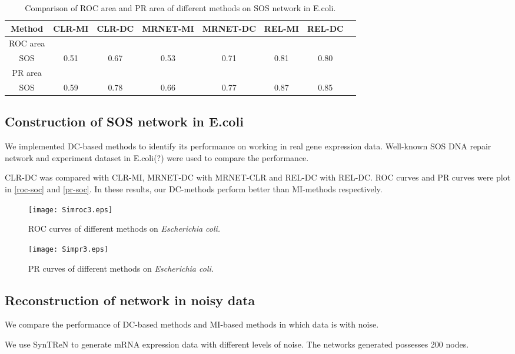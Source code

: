 \documentclass{bioinfo}
\begin{document}
\begin{table}[0.5\textwidth] \tiny
\centering \caption{Comparison of ROC area and PR area of different methods on SOS network in E.coli.}\label{roc-pr}
\begin{tabular}{cccccccc}
 \hline
 Method & CLR-MI & CLR-DC & MRNET-MI & MRNET-DC & REL-MI & REL-DC \\
 \hline
  ROC area\\
  SOS     & 0.51 & 0.67 & 0.53 & 0.71 & 0.81 & 0.80 \\
 PR area\\
  SOS   & 0.59 &0.78 & 0.66 & 0.77 & 0.87 & 0.85 \\
  \hline
\end{tabular}
\end{table}

\subsection{Construction of SOS network in E.coli}
We implemented DC-based methods to identify its performance on
working in real gene expression data. Well-known SOS DNA repair
network and experiment dataset in E.coli(?) were used to compare the
performance.

CLR-DC was compared with CLR-MI, MRNET-DC with MRNET-CLR and REL-DC
with REL-DC. ROC curves and PR curves were plot in \ref{roc-soc} and
\ref{pr-soc}. In these results, our DC-methods perform better than
MI-methods respectively.

\begin{figure}[!h]
  \texttt{[image: Simroc3.eps]}
  \caption{ROC curves of different methods on \emph{Escherichia coli.}}\label{roc-sos}
\end{figure}

\begin{figure}[!h]
  \texttt{[image: Simpr3.eps]}
  \caption{PR curves of different methods on \emph{Escherichia coli.}}\label{pr-sos}
\end{figure}

\subsection{Reconstruction of network in noisy data}
We compare the performance of DC-based methods and MI-based methods
in which data is with noise.

  We use SynTReN to generate mRNA expression data with different
levels of noise. The networks generated possesses 200 nodes.
\end{document}
